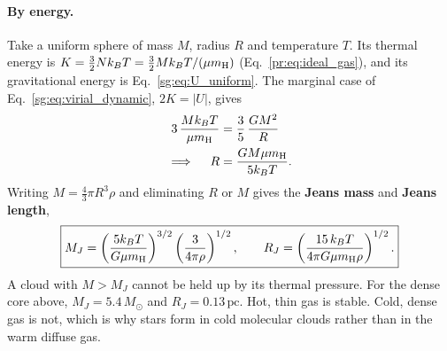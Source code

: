 \paragraph{By energy.} Take a uniform sphere of mass $M$, radius $R$ and temperature $T$. Its thermal energy is $K=\tfrac32Nk_BT=\tfrac32Mk_BT/(\mu m_{\rm H})$ (Eq.~\eqref{pr:eq:ideal_gas}), and its gravitational energy is Eq.~\eqref{sg:eq:U_uniform}. The marginal case of Eq.~\eqref{sg:eq:virial_dynamic}, $2K=|U|$, gives
\begin{align}
	3\,\frac{Mk_BT}{\mu m_{\rm H}}
	&= \frac35\,\frac{GM^2}{R} \nonumber\\
	\implies\quad R
	&= \frac{G M\mu m_{\rm H}}{5k_BT} .
\end{align}
Writing $M=\tfrac43\pi R^3\rho$ and eliminating $R$ or $M$ gives the \textbf{Jeans mass} and \textbf{Jeans length},
\begin{equation}
	\boxed{M_J=\left(\frac{5k_BT}{G\mu m_{\rm H}}\right)^{3/2}\left(\frac{3}{4\pi\rho}\right)^{1/2},\qquad
	R_J=\left(\frac{15\,k_BT}{4\pi G\mu m_{\rm H}\rho}\right)^{1/2}.}
	\label{sg:eq:jeans_mass}
\end{equation}
A cloud with $M>M_J$ cannot be held up by its thermal pressure. For the dense core above, $M_J=5.4\,M_\odot$ and $R_J=0.13\,\mathrm{pc}$. Hot, thin gas is stable. Cold, dense gas is not, which is why stars form in cold molecular clouds rather than in the warm diffuse gas.

